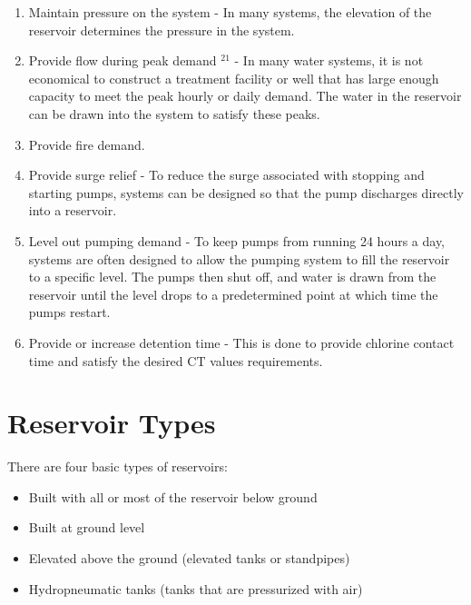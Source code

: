 \documentclass[10pt]{article}
\begin{document}
\begin{enumerate}
  \item Maintain pressure on the system - In many systems, the elevation of the reservoir determines the pressure in the system.

  \item Provide flow during peak demand ${ }^{21}$ - In many water systems, it is not economical to construct a treatment facility or well that has large enough capacity to meet the peak hourly or daily demand. The water in the reservoir can be drawn into the system to satisfy these peaks.

  \item Provide fire demand.

  \item Provide surge relief - To reduce the surge associated with stopping and starting pumps, systems can be designed so that the pump discharges directly into a reservoir.

  \item Level out pumping demand - To keep pumps from running 24 hours a day, systems are often designed to allow the pumping system to fill the reservoir to a specific level. The pumps then shut off, and water is drawn from the reservoir until the level drops to a predetermined point at which time the pumps restart.

  \item Provide or increase detention time - This is done to provide chlorine contact time and satisfy the desired $\mathrm{CT}$ values requirements.

\end{enumerate}
\section{Reservoir Types}
There are four basic types of reservoirs:

\begin{itemize}
  \item Built with all or most of the reservoir below ground

  \item Built at ground level

  \item Elevated above the ground (elevated tanks or standpipes)

  \item Hydropneumatic tanks (tanks that are pressurized with air)

\end{itemize}
\end{document}
